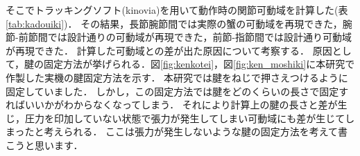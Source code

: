 \documentclass{jarticle}
\begin{document}
そこでトラッキングソフト(kinovia)を用いて動作時の関節可動域を計算した(表\ref{tab:kadouiki})．
その結果，長節腕節間では実際の蟹の可動域を再現できた，腕節-前節間では設計通りの可動域が再現できた，前節-指節間では設計通り可動域が再現できた．
計算した可動域との差が出た原因について考察する．
原因として，腱の固定方法が挙げられる．図\ref{fig:kenkotei}，図\ref{fig:ken_moshiki}に本研究で作製した実機の腱固定方法を示す．
本研究では腱をねじで押さえつけるように固定していました．
しかし，この固定方法では腱をどのくらいの長さで固定すればいいかがわからなくなってしまう．
それにより計算上の腱の長さと差が生じ，圧力を印加していない状態で張力が発生してしまい可動域にも差が生じてしまったと考えられる．
ここは張力が発生しないような腱の固定方法を考えて書こうと思います．
\end{document}
